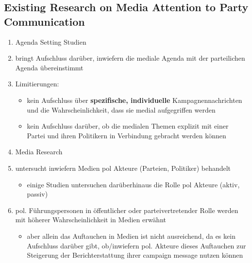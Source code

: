 \documentclass[11pt]{article}
\begin{document}
\subsection{Existing Research on Media Attention to Party Communication}
\label{sec:orga387a50}
\begin{enumerate}
\item Agenda Setting Studien
\item bringt Aufschluss darüber, inwiefern die mediale Agenda mit der parteilichen Agenda übereinstimmt
\item Limitierungen:
\begin{itemize}
\item kein Aufschluss über \textbf{spezifische, individuelle} Kampagnennachrichten und die Wahrscheinlichkeit, dass sie medial aufgegriffen werden
\item kein Aufschluss darüber, ob die medialen Themen explizit mit einer Partei und ihren Politikern in Verbindung gebracht werden können
\end{itemize}

\item Media Research
\item untersucht inwiefern Medien pol Akteure (Parteien, Politiker) behandelt
\begin{itemize}
\item einige Studien untersuchen darüberhinaus die Rolle pol Akteure (aktiv, passiv)
\end{itemize}
\item pol. Führungspersonen in öffentlicher oder parteivertretender Rolle werden mit höherer Wahrscheinlichkeit in Medien erwähnt
\begin{itemize}
\item aber allein das Auftauchen in Medien ist nicht ausreichend, da es kein Aufschluss darüber gibt, ob/inwiefern pol. Akteure dieses Auftauchen zur Steigerung der Berichterstattung ihrer campaign message nutzen können
\end{itemize}
\end{enumerate}
\end{document}
